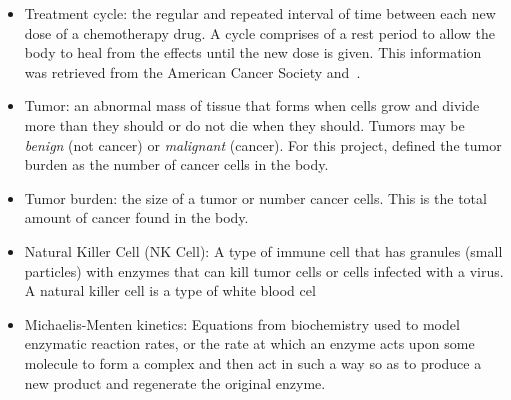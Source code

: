 \documentclass[11pt]{amsart}
\begin{document}
\begin{itemize}
	\item Treatment cycle: the regular and repeated interval of time between each new dose of a chemotherapy drug. A cycle comprises of a rest period to allow the body to heal from the effects until the new dose is given. This information was retrieved from the American Cancer Society and\ \cite{CALEY2012186}.
	\item Tumor: an abnormal mass of tissue that forms when cells grow and divide more than they should or do not die when they should. Tumors may be \textit{benign} (not cancer) or \textit{malignant} (cancer). For this project, defined the tumor burden as the number of cancer cells in the body.
	\item Tumor burden: the size of a tumor or number cancer cells. This is the total amount of cancer found in the body.
        \item Natural Killer Cell (NK Cell): A type of immune cell that has granules (small particles) with enzymes that can kill tumor cells or cells infected with a virus. A natural killer cell is a type of white blood cel
        \item Michaelis-Menten kinetics: Equations from biochemistry used to model enzymatic reaction rates, or the rate at which an enzyme acts upon some molecule to form a complex and then act in such a way so as to produce a new product and regenerate the original enzyme.
\end{itemize}
\end{document}
